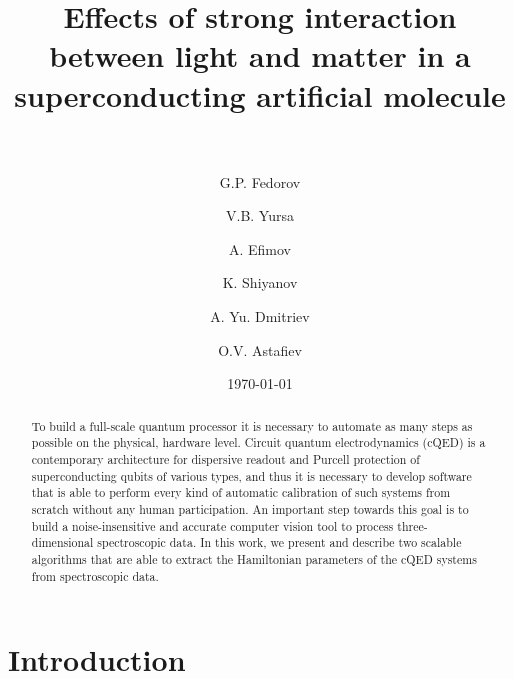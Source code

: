 \documentclass[%
 aip,
 amsmath,amssymb,
 reprint,%
]{revtex4-1}
\newcommand{\mytitile}{Effects of strong interaction between light and matter in a superconducting artificial molecule}
\begin{document}
	
	\title[\mytitile]{\mytitile\\~}
	
	\author{G.P. Fedorov}
	
	
	\author{V.B. Yursa}
	
	\author{A. Efimov}
	
	
	\author{K. Shiyanov}


	\author{A. Yu. Dmitriev}

	\author{O.V. Astafiev}
	
	
	\date{\today}%
	
	
	\begin{abstract}
		To build a full-scale quantum processor it is necessary to automate as many steps as possible on the physical, hardware level. Circuit quantum electrodynamics (cQED) is a contemporary architecture for dispersive readout and Purcell protection of superconducting qubits of various types, and thus it is necessary to develop software that is able to perform every kind of automatic calibration of such systems from scratch without any human participation. An important step towards this goal is to build a noise-insensitive and accurate computer vision tool to process three-dimensional spectroscopic data. In this work, we present and describe two scalable algorithms that are able to extract the Hamiltonian parameters of the cQED systems from spectroscopic data. 
	\end{abstract}
	
	\maketitle
\section{Introduction}
\end{document}

